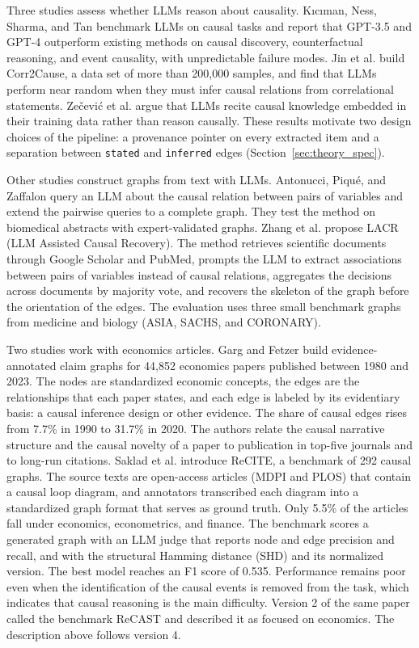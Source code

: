   Three studies assess whether LLMs reason about causality. K{\i}c{\i}man,
  Ness, Sharma, and Tan \cite{kiciman2023causal} benchmark LLMs on causal
  tasks and report that GPT-3.5 and GPT-4 outperform existing methods on
  causal discovery, counterfactual reasoning, and event causality, with
  unpredictable failure modes. Jin et al. \cite{jin2023corr2cause} build
  Corr2Cause, a data set of more than 200,000 samples, and find that LLMs
  perform near random when they must infer causal relations from
  correlational statements. Ze{\v{c}}evi{\'c} et al. \cite{zecevic2023causal}
  argue that LLMs recite causal knowledge embedded in their training data
  rather than reason causally. These results motivate two design choices of
  the pipeline: a provenance pointer on every extracted item and a separation
  between \texttt{stated} and \texttt{inferred} edges
  (Section~\ref{sec:theory_spec}).

  Other studies construct graphs from text with LLMs.
  Antonucci, Piqu{\'e}, and Zaffalon \cite{antonucci2023zeroshot} query an
  LLM about the causal relation between pairs of variables and extend the
  pairwise queries to a complete graph. They test the method on biomedical
  abstracts with expert-validated graphs. Zhang et al. \cite{zhang2024lacr}
  propose LACR (LLM Assisted Causal Recovery). The method retrieves
  scientific documents through Google Scholar and PubMed, prompts the LLM to
  extract associations between pairs of variables instead of causal
  relations, aggregates the decisions across documents by majority vote, and
  recovers the skeleton of the graph before the orientation of the edges. The
  evaluation uses three small benchmark graphs from medicine and biology
  (ASIA, SACHS, and CORONARY).

  Two studies work with economics articles. Garg and Fetzer
  \cite{garg2025causal} build evidence-annotated claim graphs for 44,852
  economics papers published between 1980 and 2023. The nodes are
  standardized economic concepts, the edges are the relationships that each
  paper states, and each edge is labeled by its evidentiary basis: a causal
  inference design or other evidence. The share of causal edges rises from
  7.7\% in 1990 to 31.7\% in 2020. The authors relate the causal narrative
  structure and the causal novelty of a paper to publication in top-five
  journals and to long-run citations. Saklad et al. \cite{saklad2025recite}
  introduce ReCITE, a benchmark of 292 causal graphs. The source texts are
  open-access articles (MDPI and PLOS) that contain a causal loop diagram,
  and annotators transcribed each diagram into a standardized graph format
  that serves as ground truth. Only 5.5\% of the articles fall under
  economics, econometrics, and finance. The benchmark scores a generated
  graph with an LLM judge that reports node and edge precision and recall,
  and with the structural Hamming distance (SHD) and its normalized version.
  The best model reaches an F1 score of 0.535. Performance remains poor even
  when the identification of the causal events is removed from the task,
  which indicates that causal reasoning is the main difficulty. Version 2 of
  the same paper called the benchmark ReCAST and described it as focused on
  economics. The description above follows version 4.

